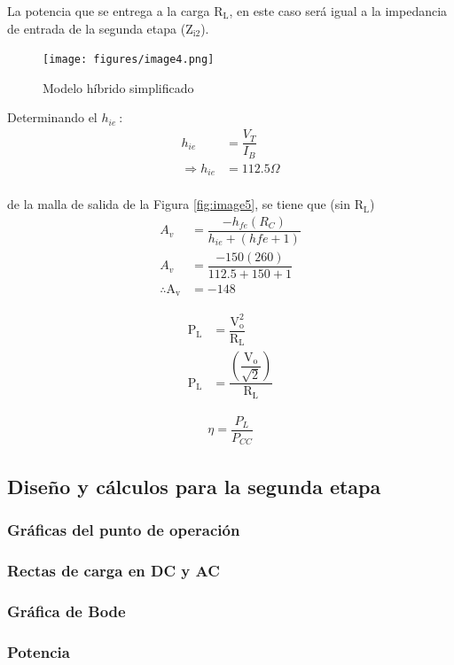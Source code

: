 \documentclass[a4paper, 12pt]{article}
\begin{document}
La potencia que se entrega a la carga $\text{R}_\text{L}$, en este caso será igual a la 
impedancia de entrada de la segunda etapa ($\text{Z}_{\text{i2}}$).
\begin{figure}[H]
    \centering
    \texttt{[image: figures/image4.png]}
    \caption{Modelo híbrido simplificado}
    \label{fig:image5}
\end{figure}

Determinando el $h_{ie}\ $:
\begin{align*}
    h_{ie} &= \dfrac{V_T}{I_B}\\[1mm]
    \Rightarrow h_{ie} &= 112.5 \Omega\\
\end{align*}

de la malla de salida de la Figura \eqref{fig:image5}, se tiene que (sin $\text{R}_\text{L}$)
\begin{align*}
    A_v &= \dfrac{-h_{fe}(R_C)}{h_{ie}+(hfe+1)} \\[1.5mm]
    A_v &= \dfrac{-150(260)}{112.5+150+1}\\[1mm]
    \therefore \text{A}_\text{v} &= -148
\end{align*}

\begin{align*}
    \text{P}_\text{L} &= \dfrac{\text{V}_{\text{o}}^2}{\text{R}_\text{L}}\\[1.5mm]
    \text{P}_\text{L} &= \dfrac{\left(\dfrac{\text{V}_\text{o}}{\sqrt{2}}\right)}
    {\text{R}_\text{L}}
\end{align*}

\begin{align*}
    \eta = \dfrac{P_L}{P_{CC}}
\end{align*}
\subsection{Diseño y cálculos para la segunda etapa}
\subsubsection{Gráficas del punto de operación}
\subsubsection{Rectas de carga en DC y AC}
\subsubsection{Gráfica de Bode}
\subsubsection{Potencia}
\end{document}
